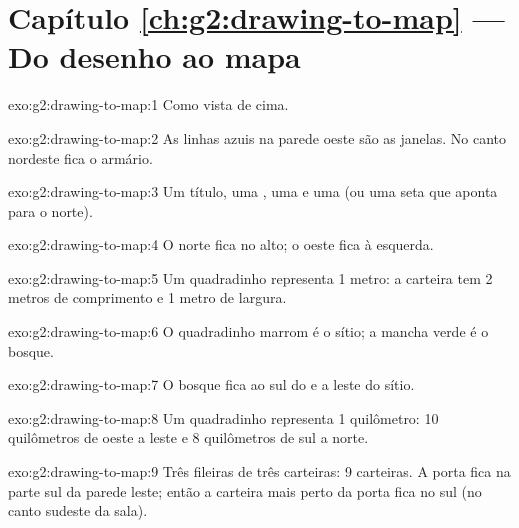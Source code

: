 \section*{Capítulo \ref{ch:g2:drawing-to-map} --- Do desenho ao mapa}

\begin{solution}{exo:g2:drawing-to-map:1}
Como vista de cima.
\end{solution}

\begin{solution}{exo:g2:drawing-to-map:2}
As linhas azuis na parede oeste são as janelas. No canto nordeste fica o
armário.
\end{solution}

\begin{solution}{exo:g2:drawing-to-map:3}
Um título, uma , uma  e uma  (ou uma seta que aponta para o norte).
\end{solution}

\begin{solution}{exo:g2:drawing-to-map:4}
O norte fica no alto; o oeste fica à esquerda.
\end{solution}

\begin{solution}{exo:g2:drawing-to-map:5}
Um quadradinho representa 1 metro: a carteira tem 2 metros de comprimento e 1 metro de largura.
\end{solution}

\begin{solution}{exo:g2:drawing-to-map:6}
O quadradinho marrom é o sítio; a mancha verde é o bosque.
\end{solution}

\begin{solution}{exo:g2:drawing-to-map:7}
O bosque fica ao sul do  e a leste do sítio.
\end{solution}

\begin{solution}{exo:g2:drawing-to-map:8}
Um quadradinho representa 1 quilômetro: 10 quilômetros de oeste a leste e 8
quilômetros de sul a norte.
\end{solution}

\begin{solution}{exo:g2:drawing-to-map:9}
Três fileiras de três carteiras: 9 carteiras. A porta fica na parte sul da
parede leste; então a carteira mais perto da porta fica no sul (no canto
sudeste da sala).
\end{solution}

